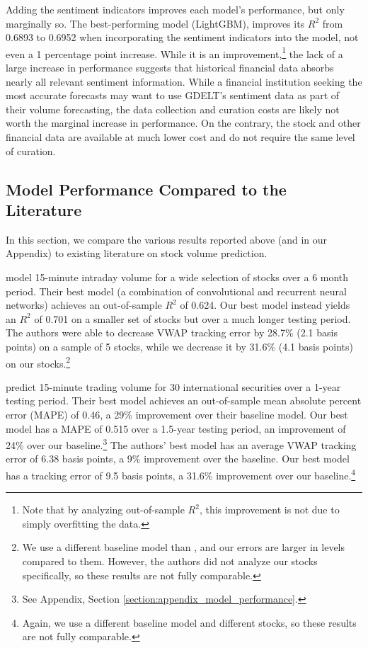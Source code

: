 \documentclass[12pt]{article}
\begin{document}
Adding the sentiment indicators improves each model's performance, but only marginally so. The best-performing model (LightGBM), improves its $R^2$ from 0.6893 to 0.6952 when incorporating the sentiment indicators into the model, not even a 1 percentage point increase. While it is an improvement,\footnote{Note that by analyzing out-of-sample $R^2$, this improvement is not due to simply overfitting the data.} the lack of a large increase in performance suggests that historical financial data absorbs nearly all relevant sentiment information. While a financial institution seeking the most accurate forecasts may want to use GDELT's sentiment data as part of their volume forecasting, the data collection and curation costs are likely not worth the marginal increase in performance. On the contrary, the stock and other financial data are available at much lower cost and do not require the same level of curation.

\subsection{Model Performance Compared to the Literature}
In this section, we compare the various results reported above (and in our Appendix) to existing literature on stock volume prediction.

\textcite{cucuringu2025forecasting} model 15-minute intraday volume for a wide selection of stocks over a 6 month period. Their best model (a combination of convolutional and recurrent neural networks) achieves an out-of-sample $R^2$ of 0.624. Our best model instead yields an $R^2$ of 0.701 on a smaller set of stocks but over a much longer testing period. The authors were able to decrease VWAP tracking error by 28.7\% (2.1 basis points) on a sample of 5 stocks, while we decrease it by 31.6\% (4.1 basis points) on our stocks.\footnote{We use a different baseline model than \textcite{cucuringu2025forecasting}, and our errors are larger in levels compared to them. However, the authors did not analyze our stocks specifically, so these results are not fully comparable.}

\textcite{chen2016forecasting} predict 15-minute trading volume for 30 international securities over a 1-year testing period. Their best model achieves an out-of-sample mean absolute percent error (MAPE) of 0.46, a 29\% improvement over their baseline model. Our best model has a MAPE of 0.515 over a 1.5-year testing period, an improvement of 24\% over our baseline.\footnote{See Appendix, Section \ref{section:appendix_model_performance}.} The authors' best model has an average VWAP tracking error of 6.38 basis points, a 9\% improvement over the baseline. Our best model has a tracking error of 9.5 basis points, a 31.6\% improvement over our baseline.\footnote{Again, we use a different baseline model and different stocks, so these results are not fully comparable.}
\end{document}
